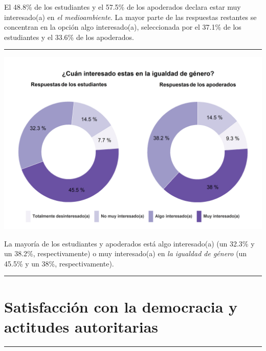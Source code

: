 \documentclass[
  14pt,
]{book}
\let\origfigure\figure
\let\endorigfigure\endfigure
\renewenvironment{figure}[1][2] {
  \expandafter\origfigure\expandafter[H]
} {
  \endorigfigure
}
\begin{document}
El 48.8\% de los estudiantes y el 57.5\% de los apoderados declara estar muy interesado(a) en \emph{el medioambiente}. La mayor parte de las respuestas restantes se concentran en la opción algo interesado(a), seleccionada por el 37.1\% de los estudiantes y el 33.6\% de los apoderados.

\begin{center}\rule{0.5\linewidth}{0.5pt}\end{center}

\begin{figure}[!ht]

{\centering \includegraphics[width=0.8\linewidth,]{images/graph_intgen} 

}

\caption{Interés en la igualdad de género}\label{fig:unnamed-chunk-40}
\end{figure}

La mayoría de los estudiantes y apoderados está algo interesado(a) (un 32.3\% y un 38.2\%, respectivamente) o muy interesado(a) en \emph{la igualdad de género} (un 45.5\% y un 38\%, respectivamente).

\begin{center}\rule{0.5\linewidth}{0.5pt}\end{center}

\hypertarget{satisfacciuxf3n-con-la-democracia-y-actitudes-autoritarias}{%
\section{Satisfacción con la democracia y actitudes autoritarias}\label{satisfacciuxf3n-con-la-democracia-y-actitudes-autoritarias}}

\begin{center}\rule{0.5\linewidth}{0.5pt}\end{center}
\end{document}
